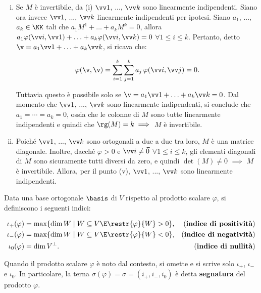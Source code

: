 \documentclass[11pt]{article}
\begin{document}
\begin{solution}
\begin{enumerate}[(i)]
			\item Se $M$ è invertibile, da (i) $\vv1$, ..., $\vv k$ sono linearmente indipendenti. Siano ora
			invece $\vv 1$, ..., $\vv k$ linearmente indipendenti per ipotesi. Siano $a_1$, ..., $a_k \in \KK$ tali
			che $a_1 M^1 + \ldots + a_k M^k = 0$, allora $a_1 \varphi(\vv i, \vv 1) + \ldots + a_k \varphi(\vv i, \vv k) = 0$ $\forall 1 \leq i \leq k$. Pertanto, detto $\v = a_1 \vv 1 + \ldots + a_k \vv k$, si ricava che:
			
			\[ \varphi(\v, \v) = \sum_{i=1}^k \sum_{j=1}^k a_j \, \varphi(\vv i, \vv j) = 0. \]
			
			Tuttavia questo è possibile solo se $\v = a_1 \vv 1 + \ldots + a_k \vv k = 0$. Dal momento che
			$\vv 1$, ..., $\vv k$ sono linearmente indipendenti, si conclude che $a_1 = \cdots = a_k = 0$, ossia
			che le colonne di $M$ sono tutte linearmente indipendenti e quindi che $\rg(M) = k \implies$ $M$ è invertibile.
			
			\item Poiché $\vv 1$, ..., $\vv k$ sono ortogonali a due a due tra loro, $M$ è una matrice diagonale.
			Inoltre, dacché $\varphi > 0$ e $\vv i \neq \vec 0$ $\forall 1 \leq i \leq k$, gli elementi diagonali di $M$ sono sicuramente tutti diversi da zero, e quindi $\det (M) \neq 0$ $\implies$ $M$ è invertibile. Allora,
			per il punto (v), $\vv 1$, ..., $\vv k$ sono linearmente indipendenti.
		\end{enumerate}
	\end{solution}

	\begin{definition}
		Data una base ortogonale $\basis$ di $V$ rispetto al prodotto
		scalare $\varphi$,
		si definiscono i seguenti indici:
		
		\begin{align*}
			\iota_+(\varphi) &= \max\{ \dim W \mid W \subseteq V \E \restr{\varphi}{W} > 0 \}, &\text{(}\textbf{indice di positività}\text{)} \\
			\iota_-(\varphi) &= \max\{ \dim W \mid W \subseteq V \E \restr{\varphi}{W} < 0 \}, &\text{(}\textbf{indice di negatività}\text{)}\\
			\iota_0(\varphi) &= \dim V^\perp. &\text{(}\textbf{indice di nullità}\text{)}
		\end{align*}
	
		Quando il prodotto scalare $\varphi$ è noto dal contesto, si omette
		e si scrive solo $\iota_+$, $\iota_-$ e $\iota_0$. In particolare,
		la terna $\sigma(\varphi) = \sigma = (i_+, i_-, i_0)$ è detta \textbf{segnatura} del
		prodotto $\varphi$.
	\end{definition}
	
\end{document}
